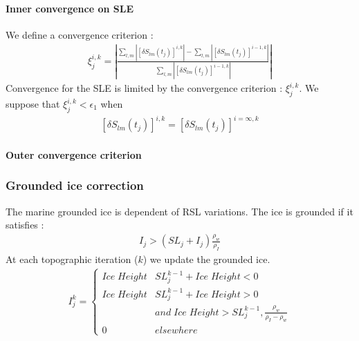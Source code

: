 \documentclass[letterpaper,10pt,english]{sphinxmanual}
\begin{document}
\paragraph{Inner convergence on SLE}
\label{\detokenize{numerical_imp:inner-convergence-on-sle}}\label{\detokenize{numerical_imp:conv}}
\sphinxAtStartPar
We define a convergence criterion :
\begin{equation*}
\begin{split}\xi^{i,k}_j=|\frac{\sum_{l,m}|[\delta S_{lm}(t_j)]^{i,k}|-\sum_{l,m}|[\delta S_{lm}(t_j)]^{i-1,k}|}{\sum_{l,m}|[\delta S_{lm}(t_j)]^{i-1,k}|}|\end{split}
\end{equation*}
\sphinxAtStartPar
Convergence for the SLE is limited by the convergence criterion : \(\xi_j^{i,k}\). We suppose that \(\xi_j^{i,k} < \epsilon_1\) when
\begin{equation*}
\begin{split}[\delta S_{lm}(t_j)]^{i,k}=[\delta S_{lm}(t_j)]^{i=\infty,k}\end{split}
\end{equation*}

\paragraph{Outer convergence criterion}
\label{\detokenize{numerical_imp:outer-convergence-criterion}}

\subsubsection{Grounded ice correction}
\label{\detokenize{numerical_imp:grounded-ice-correction}}\label{\detokenize{numerical_imp:ice-corr}}
\sphinxAtStartPar
The marine grounded ice is dependent of RSL variations. The ice is grounded if it satisfies :
\begin{equation*}
\begin{split}I_j > (SL_j + I_j)\frac{\rho_w}{\rho_I}\end{split}
\end{equation*}
\sphinxAtStartPar
At each topographic iteration (\(k\)) we update the grounded ice.
\begin{equation*}
\begin{split}I_j^k =
\begin{cases}
    Ice\;Height & SL_j^{k-1} + Ice\;Height < 0 \\
    Ice\;Height & SL_j^{k-1} + Ice\;Height > 0 \\
     & and\;Ice\;Height > SL_j^{k-1},\frac{\rho_w}{\rho_I-\rho_w} \\
    0 & elsewhere
\end{cases}\end{split}
\end{equation*}
\end{document}
